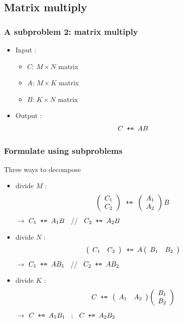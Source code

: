 \documentclass[12pt,dvipdfmx]{beamer}
\newcommand{\plusequal}{\mbox{\tt\ += }}
\begin{document}
\subsection{Matrix multiply}
\begin{frame}[fragile]
\frametitle{A subproblem 2: matrix multiply}
\begin{itemize}
\item Input :
  \begin{itemize}
  \item $C$: $M \times N$ matrix 
  \item $A$: $M \times K$ matrix
  \item $B$: $K \times N$ matrix
  \end{itemize}

\item Output :
  \[ C \plusequal A B \]
\end{itemize}

\begin{center}
\def\svgwidth{\textwidth}

\end{center}

\end{frame}


\begin{frame}
\frametitle{Formulate using subproblems}
Three ways to decompose
\begin{itemize}
\item divide $M$ :
\[
\left(
\begin{array}{c}
  C_1 \\
  C_2 \\
\end{array}
\right)
\plusequal
\left(
\begin{array}{c}
  A_1 \\
  A_2 \\
\end{array}
\right)
B 
\]
$\rightarrow$ $C_1 \plusequal A_1 B$ \mbox{ // } $C_2 \plusequal A_2 B$

\item divide $N$ :
\[
\left(
\begin{array}{cc}
  C_1 & C_2 \\
\end{array}
\right)
\plusequal
A
\left(
\begin{array}{cc}
  B_1 & B_2 \\
\end{array}
\right)
\]
$\rightarrow$ $C_1 \plusequal A B_1$ \mbox{ // } $C_2 \plusequal A B_2$

\item divide $K$ :
\[
C
\plusequal
\left(
\begin{array}{cc}
  A_1 & A_2 \\
\end{array}
\right)
\left(
\begin{array}{c}
  B_1 \\ 
  B_2 \\
\end{array}
\right)
\]
$\rightarrow$ $C \plusequal A_1 B_1$ \mbox{ ; } $C \plusequal A_2 B_2$
\end{itemize}
\end{frame}
\end{document}
